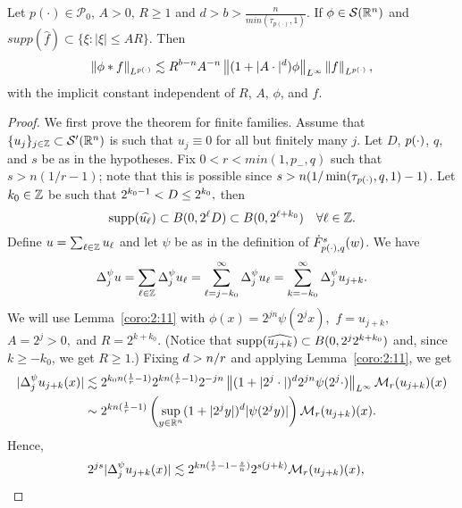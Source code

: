 {\begin{lemma}\label{lemma:variableLebesgue}
Let $p(\cdot) \in \mathcal{P}_0$, $A>0$, $R\geq 1$ and $d>b>\frac{n}{min(\tau_{p(\cdot)},1)}$. If $\phi \in \sw$ and $supp(\widehat{f}) \subset \{\xi: |\xi| \leq AR \}$. Then 
\begin{equation}
\norm{\phi \ast f}{\Lp} \lesssim R^{b-n}A^{-n}\norm{(1+|A\cdot|^d)\phi}{L^\infty}\norm{f}{\Lp},
\end{equation}
with the implicit constant independent of $R$, $A$, $\phi$, and $f$.
\end{lemma}



\begin{proof}
We first prove the theorem for finite families. Assume that $\{u_j\}_{j \in \ent} \subset \mathcal{S}'(\rn)$ is such that $u_j \equiv 0$ for all but finitely many $j$. Let $D$, $\pp$, $q$, and $s$ be as in the hypotheses. Fix $0<r<min(1,p_-,q)$ such that $s>n(1/r-1)$; note that this is possible since $s>n(1/\min(\tau_{\pp},q,1)-1)$. Let $k_0 \in \ent$ be such that $2^{k_0 -1} < \A\leq 2^{k_0},$ then  
\[
\supp(\widehat{u_\ell}) \subset B(0, 2^\ell \A) \subset B(0, 2^{\ell +k_0}) \quad \forall \ell \in \ent.
\]
Define $u =\sum_{\ell \in \ent} u_\ell$ and let $\psi$ be as in the definition of $\tlw{\pp}{s}{q}{w}$. We have
\begin{equation}\label{psi*u}
\Delta^\psi_j u = \sum_{\ell \in \ent} \Delta^\psi_j u_\ell = \sum_{\ell = j - k_0}^\infty \Delta^\psi_j  u_\ell = \sum_{k = - k_0}^\infty \Delta^\psi_j u_{j+k}.
\end{equation}
We will use Lemma~\ref{coro:2:11} with $\phi(x) =  2^{jn} \psi(2^j x),$  $f = u_{j+k},$  $A= 2^{j}>0,$ and $R= 2^{k + k_0}.$ (Notice that $\supp(\widehat{u_{j+k}}) \subset  B(0, 2^{j} 2^{k + k_0})$ and, since $k \geq -k_0$, we get $R \geq 1$.) Fixing  $\ex>n/r$ and applying Lemma~\ref{coro:2:11}, we get
\begin{align*}
|\Delta^\psi_j  u_{j+k}(x)| & \lesssim   2^{k_0n(\frac{1}{r} -1)} 2^{k n (\frac{1}{r} -1)}  2^{-jn} \norm{(1 + |2^j \cdot|)^\ex 2^{jn}\psi (2^j\cdot)}{L^\infty}  \M_r(u_{j+k})(x)\\
& \sim  2^{k n (\frac{1}{r} -1)} \left( \sup_{y \in \rn} (1 + |2^j y|)^\ex |\psi(2^j y)|\right) \M_r(u_{j+k})(x).
\end{align*}
 Hence,
\begin{align*}
2^{js}|\Delta^\psi_j  u_{j+k}(x)| & \lesssim 2^{k n (\frac{1}{r} -1-\frac{s}{n})} 2^{s(j+k)}\M_r(u_{j+k})(x),
\end{align*}

\end{proof}}
